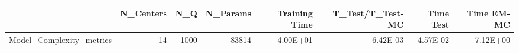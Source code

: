 \begin{tabular}{lrrrrrrr}
\toprule
{} &  N\_Centers &   N\_Q &  N\_Params &  Training Time &  T\_Test/T\_Test-MC &  Time Test &  Time EM-MC \\
\midrule
Model\_Complexity\_metrics &         14 &  1000 &     83814 &       4.00E+01 &          6.42E-03 &   4.57E-02 &    7.12E+00 \\
\bottomrule
\end{tabular}

